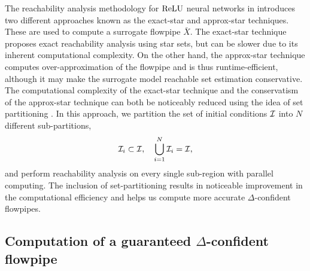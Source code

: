 The reachability analysis methodology for $\mathrm{ReLU}$ neural networks in \cite{tran2020nnv} introduces two different approaches known as the exact-star and approx-star techniques. These are used to compute a surrogate flowpipe $\bar{X}$. The exact-star technique proposes exact reachability analysis using star sets, but can be slower due to its inherent computational complexity. On the other hand, the approx-star technique computes over-approximation of the flowpipe and is thus runtime-efficient, although it may make the surrogate model reachable set estimation conservative. The computational complexity of the exact-star technique and the conservatism of the approx-star technique can both be noticeably reduced using the idea of set partitioning \cite{tran2020nnv}. In this approach, we partition the set of initial conditions $\mathcal{I}$ into $N$ different sub-partitions,
$$
\mathcal{I}_i \subset \mathcal{I} , \quad \bigcup_{i=1}^N \mathcal{I}_i =\mathcal{I}, 
$$
and perform reachability analysis on every single sub-region with parallel computing. The inclusion of set-partitioning results in noticeable improvement in the computational efficiency and helps us compute more
accurate $\Delta$-confident flowpipes.



\subsection{Computation of a guaranteed $\Delta$-confident flowpipe}

